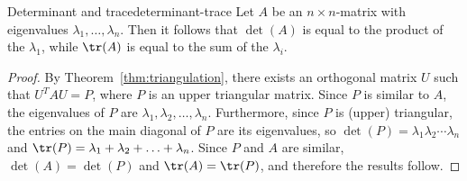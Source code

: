 \begin{corollary}{Determinant and trace}{determinant-trace}
Let $A$ be an $n \times n$-matrix with eigenvalues $\lambda_1,\ldots, \lambda_n$. Then it follows that $\det(A)$ is equal to the product of the $\lambda_1$, while $\tr(A)$ is equal to the sum of the $\lambda_i$. 
\end{corollary}

\begin{proof}
By Theorem~\ref{thm:triangulation}, there exists an orthogonal matrix $U$ such
that $U^TAU=P$, where $P$ is an upper triangular matrix.
Since $P$ is similar to $A$, the eigenvalues
of $P$ are $\lambda_1, \lambda_2, \ldots, \lambda_n$.
Furthermore, since $P$ is (upper) triangular, the entries on the
main diagonal of $P$ are its eigenvalues, so
$\det(P)=\lambda_1 \lambda_2 \cdots \lambda_n$ and
$\tr(P)=\lambda_1 + \lambda_2 + \ldots + \lambda_n$.
Since $P$ and $A$ are similar, $\det(A)=\det(P)$ and $\tr(A)=\tr(P)$,
and therefore the results follow.
\end{proof}
